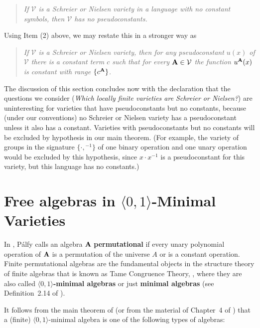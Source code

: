 \documentclass[12pt]{amsart}
\theoremstyle{definition}
\numberwithin{equation}{section}
\newcommand{\m}[1]{{\mathbf{\uppercase{#1}}}}
\begin{document}
\begin{quote}{\it
  If $\mathcal V$ is a Schreier or Nielsen variety in a language with
no constant symbols, then $\mathcal V$ has no pseudoconstants.}
\end{quote}

Using Item (2) above, we may restate this in a stronger way as

\begin{quote}
{\it If $\mathcal V$ is a Schreier or Nielsen variety, then
for any pseudoconstant $u(x)$ of $\mathcal V$
there is a constant term $c$ such that for every $\m a\in \mathcal V$
the function 
$u^{\m a}(x)$ is constant with range $\{c^{\m a}\}$.}
\end{quote}

The discussion of this section concludes
now with the declaration that the questions
we consider (\emph{Which locally finite varieties
are Schreier or Nielsen?}) are uninteresting for
varieties that have pseudoconstants
but no constants, because
(under our conventions) no Schreier or Nielsen
variety has a pseudoconstant 
unless it also has a constant.
Varieties with pseudoconstants 
but no constants will be excluded
by hypothesis in our main theorem.
(For example, the variety of groups
in the signature $\{\cdot, {}^{-1}\}$
of one binary operation and one unary operation
would be excluded by this hypothesis, since $x\cdot x^{-1}$
is a pseudoconstant for this variety, but this
language has no constants.)

\section{Free algebras in
  $\langle 0,1\rangle$-Minimal Varieties} \label{decomp}

In \cite{palfy}, P\'{a}lfy calls
an algebra $\m a$ \textbf{permutational}
if every unary polynomial operation of $\m a$ is a permutation
of the universe $A$ or is a constant operation.
Finite permutational algebras
are the fundamental objects in the structure
theory of finite algebras
that is known as Tame Congruence Theory, \cite{HM},
where they are also called \textbf{$\langle 0,1\rangle$-minimal algebras}
or just \textbf{minimal algebras}
(see Definition~2.14 of \cite{HM}).

It follows from the main theorem of
\cite{palfy} (or from the material of Chapter~4 of \cite{HM}) that
a (finite) $\langle 0,1\rangle$-minimal
algebra is one of the following types of algebras:
\smallskip
\end{document}
